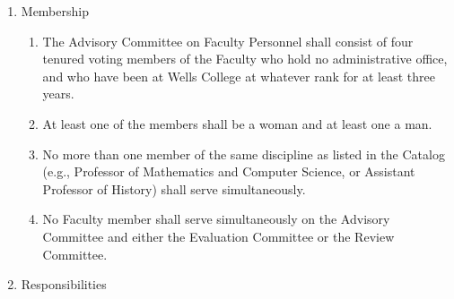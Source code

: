 \documentclass{manual}
\newcommand{\itemLevelA}{\alph*.}
\newcommand{\itemLevelB}{\arabic*)}
\newcommand{\itemRefA}{\alph*}
\newcommand{\itemRefB}{\arabic*}
\begin{document}
				\begin{enumerate}[label=\itemLevelA,ref=\itemRefA]
				\item Membership \label{item:membership06}

					\begin{enumerate}[label=\itemLevelB,ref=\itemRefB]
					\item The Advisory Committee on Faculty Personnel shall consist of four tenured voting members of the Faculty who hold no administrative office, and who have been at Wells College at whatever rank for at least three years.
					\item At least one of the members shall be a woman and at least one a man.
					\item\label{iitem:crossdiscipline07} No more than one member of the same discipline as listed in the Catalog (e.g., Professor of Mathematics and Computer Science, or Assistant Professor of History) shall serve simultaneously.
					\item No Faculty member shall serve simultaneously on the Advisory Committee and either the Evaluation Committee or the Review Committee.
					\end{enumerate}

				\item Responsibilities


\end{enumerate}
\end{document}
